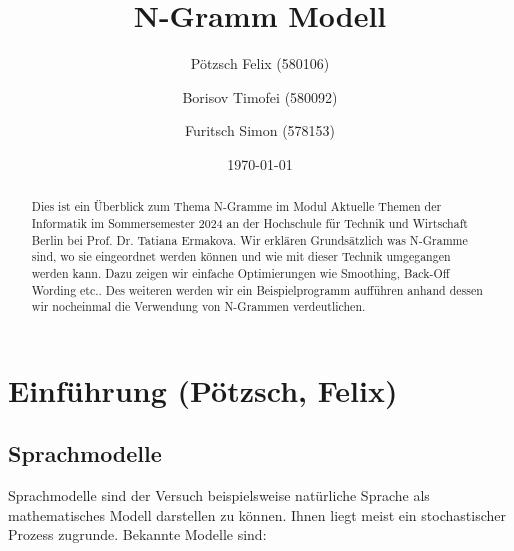 \documentclass[12pt]{article}
\title{N-Gramm Modell}
\author{
  Pötzsch Felix (580106)\\
  \and
  Borisov Timofei (580092) \\
  \and
  Furitsch Simon (578153)\\
}
\date{\today}
\begin{document}
\maketitle

\begin{abstract}
	Dies ist ein Überblick zum Thema N-Gramme im Modul
	Aktuelle Themen der Informatik im Sommersemester 2024 an der
	Hochschule für Technik und Wirtschaft Berlin bei Prof. Dr. Tatiana Ermakova.
	Wir erklären Grundsätzlich was N-Gramme sind, wo sie eingeordnet werden können und wie mit dieser Technik umgegangen werden kann.
	Dazu zeigen wir einfache Optimierungen wie Smoothing, Back-Off Wording etc..
	Des weiteren werden wir ein Beispielprogramm aufführen anhand dessen wir nocheinmal
	die Verwendung von N-Grammen verdeutlichen.
\end{abstract}

\tableofcontents
\clearpage

\section{Einführung (Pötzsch, Felix)}

\subsection{Sprachmodelle}
Sprachmodelle sind der Versuch beispielsweise natürliche Sprache als mathematisches
Modell darstellen zu können. Ihnen liegt meist ein stochastischer Prozess zugrunde.
Bekannte Modelle sind:
\end{document}
